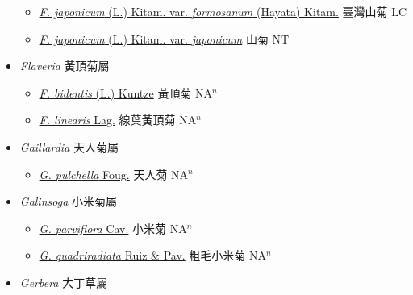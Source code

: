 \begin{itemize}
  \begin{itemize}
        \item[] \href{http://www.theplantlist.org/tpl1.1/search?q=Farfugium+japonicum+var.+formosanum}{\textit{F. japonicum} (L.) Kitam. var. \textit{formosanum} (Hayata) Kitam.}   臺灣山菊 LC
        \item[] \href{http://www.theplantlist.org/tpl1.1/search?q=Farfugium+japonicum+var.+japonicum}{\textit{F. japonicum} (L.) Kitam. var. \textit{japonicum}}   山菊 NT
  \end{itemize}
 \item[] \textit{Flaveria} 黃頂菊屬
                    
  \begin{itemize}
        \item[] \href{http://www.theplantlist.org/tpl1.1/search?q=Flaveria+bidentis}{\textit{F. bidentis} (L.) Kuntze}   黃頂菊 NA$^n$
        \item[] \href{http://www.theplantlist.org/tpl1.1/search?q=Flaveria+linearis}{\textit{F. linearis} Lag.}   線葉黃頂菊 NA$^n$
  \end{itemize}
 \item[] \textit{Gaillardia} 天人菊屬
                    
  \begin{itemize}
        \item[] \href{http://www.theplantlist.org/tpl1.1/search?q=Gaillardia+pulchella}{\textit{G. pulchella} Foug.}   天人菊 NA$^n$
  \end{itemize}
 \item[] \textit{Galinsoga} 小米菊屬
                    
  \begin{itemize}
        \item[] \href{http://www.theplantlist.org/tpl1.1/search?q=Galinsoga+parviflora}{\textit{G. parviflora} Cav.}   小米菊 NA$^n$
        \item[] \href{http://www.theplantlist.org/tpl1.1/search?q=Galinsoga+quadriradiata}{\textit{G. quadriradiata} Ruiz \& Pav.}   粗毛小米菊 NA$^n$
  \end{itemize}
 \item[] \textit{Gerbera} 大丁草屬
                    

\end{itemize}
